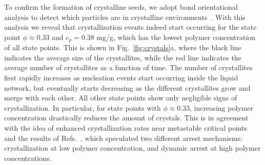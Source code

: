 \documentclass[preprint,amsmath,amssymb,superscriptaddress]{revtex4-1}
\begin{document}
To confirm the formation of crystalline seeds, we adopt bond orientational analysis to detect which particles are in crystalline environments~\cite{russo2013interplay}. 
With this analysis we reveal that crystallization events indeed start occurring for the state point $\phi\approx 0.33$ and $c_p=0.38$ mg/g, which has the lowest
polymer concentration of all state points. This is shown in Fig.~\ref{fig:crystals}a, where the black line indicates the average size of the crystallites, 
while the red line indicates the average number of crystallites as a function of time. The number of crystallites first rapidly increases as nucleation events
start occurring inside the liquid network, but eventually starts decreasing as the different crystallites grow and merge with each other.
All other state points show only negligible signs of crystallization. In particular, for state points with $\phi\approx 0.33$, increasing
polymer concentration drastically reduces the amount of crystals. This is in agreement with the
idea of enhanced crystallization rates near metastable critical points~\cite{ten1997enhancement,olmsted1998spinodal} and the
results of Refs.~\cite{soga1999metastable,fortini2008crystallization,perez2011pathways},
which speculated two different arrest mechanisms: crystallization at low polymer concentration, and dynamic arrest at high polymer concentrations.
\end{document}
